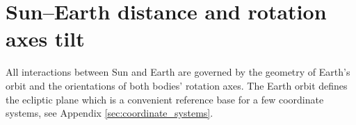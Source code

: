 





\section{Sun--Earth distance and rotation axes tilt}
\label{sec:sun_earth_orbit_geometry}
All interactions between Sun and Earth are governed by the geometry of Earth's orbit and the orientations of both bodies' rotation axes. The Earth orbit defines the ecliptic plane which is a convenient reference base for a few coordinate systems, see Appendix \ref{sec:coordinate_systems}.

